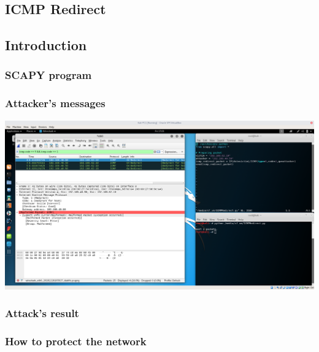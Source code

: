 \subsection{ICMP Redirect}
\subsection{Introduction}


\subsubsection{SCAPY program}


\subsubsection{Attacker's messages}
\includegraphics[width=16cm]{img/ICMPRedirect.png}

\subsubsection{Attack's result}


\subsubsection{How to protect the network}
